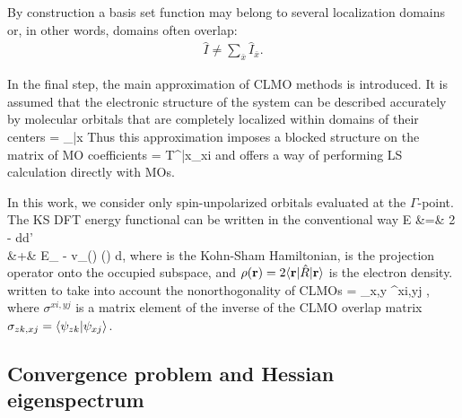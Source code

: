 \documentclass[aps,prl,twocolumn,reprint,amsmath,amssymb]{revtex4-1}
\begin{document}
By construction a basis set function may belong to several localization domains or, in other words, domains often overlap:
%
\begin{eqnarray}
\label{eq:span}
\hat{I} \neq \sum_{\bar{x}} \hat{I}_{\bar{x}}.
\end{eqnarray}

In the final step, the main approximation of CLMO methods is introduced. It is assumed that the electronic structure of the system can be described accurately by molecular orbitals that are completely localized within domains of their centers
%
\bea
{} = _{\bar{x}} 
\label{eq:LMO}
\eea
%
Thus this approximation imposes a blocked structure on the matrix of MO coefficients
\bea
{} =  {T^{\bar{x}\mu}}_{xi}
\label{eq:LMOproj}
\eea
%
and offers a way of performing LS calculation directly with MOs. %

In this work, we consider only spin-unpolarized orbitals evaluated at the $\Gamma$-point. The KS DFT energy functional can be written in the conventional way 
\bea
E &=& 2 \trace \left[ \op{R} \op{H} \right] -  \int\int {}d\br d\br' \nonumber \\
 &+& E_{} - \int v_{}(\br) \rho(\br) d\br,
\eea
%
where  is the Kohn-Sham Hamiltonian,  is the projection operator onto the occupied subspace, and $\rho(\mathbf{r}) = 2\langle \mathbf{r} \vert\hat{R}\vert \mathbf{r} \rangle$ is the electron density.  written to take into account the nonorthogonality of CLMOs
\bea \label{eq:dm}
 = \sum_{x,y}  \sigma^{xi,yj} ,
\eea
%
where $\sigma^{xi,yj}$ is a matrix element of the inverse of the CLMO overlap matrix $\sigma_{zk,xj} = \langle  \psi_{zk} \vert  \psi_{xj} \rangle $. %

\subsection{Convergence problem and Hessian eigenspectrum}
\end{document}
